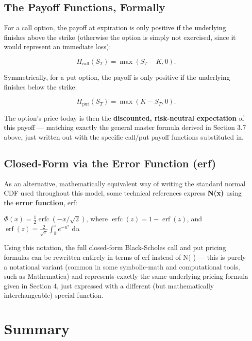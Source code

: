 \documentclass[12pt,openany]{book}
\theoremstyle{definition}
\theoremstyle{remark}
\newcommand{\dd}{\,\mathrm{d}}
\begin{document}
\subsection{The Payoff Functions, Formally}

For a call option, the payoff at expiration is only positive if the underlying finishes above the strike (otherwise the option is simply not exercised, since it would represent an immediate loss):

\[H_{\mathrm{call}}(S_T)=\max(S_T-K,0).\]

Symmetrically, for a put option, the payoff is only positive if the underlying finishes below the strike:

\[H_{\mathrm{put}}(S_T)=\max(K-S_T,0).\]

The option's price today is then the \textbf{discounted, risk-neutral expectation} of this payoff --- matching exactly the general master formula derived in Section 3.7 above, just written out with the specific call/put payoff functions substituted in.

\subsection{Closed-Form via the Error Function (erf)}

As an alternative, mathematically equivalent way of writing the standard normal CDF used throughout this model, some technical references express \textbf{N(x)} using the \textbf{error function}, erf:

\(\Phi(x)=\tfrac12\operatorname{erfc}(-x/\sqrt2)\), where \(\operatorname{erfc}(z)=1-\operatorname{erf}(z)\), and \(\operatorname{erf}(z)=\tfrac2{\sqrt\pi}\int_0^z e^{-u^2}\,\dd u\)

Using this notation, the full closed-form Black-Scholes call and put pricing formulas can be rewritten entirely in terms of erf instead of N( ) --- this is purely a notational variant (common in some symbolic-math and computational tools, such as Mathematica) and represents exactly the same underlying pricing formula given in Section 4, just expressed with a different (but mathematically interchangeable) special function.

\section{Summary}
\end{document}
